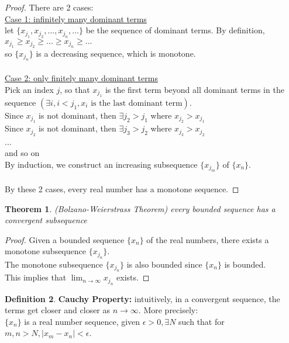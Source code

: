\documentclass[12pt]{article}
\theoremstyle{plain}
\newtheorem{theorem}{Theorem}[section]
\theoremstyle{definition}
\newtheorem{definition}[theorem]{Definition}
\begin{document}
\begin{proof}
    There are 2 cases:\\
    \underline{Case 1: infinitely many dominant terms}\\
    let $\{ x_{j_1}, x_{j_2}, ..., x_{j_n},... \}$ be the sequence of dominant terms. By definition, $x_{j_1} \geq x_{j_2} \geq ... \geq x_{j_n} \geq...$\\
    so $\{ x_{j_n} \}$ is a decreasing sequence, which is monotone.
    \\
    \\
    \underline{Case 2: only finitely many dominant terms}\\
    Pick an index $j$, so that $x_{j_1}$ is the first term beyond all dominant terms in the sequence $(\exists i, i<j_1, x_i \text{ is the last dominant term})$.\\
    Since $x_{j_1}$ is not dominant, then $\exists j_2 > j_1$ where $x_{j_2} > x_{j_1}$\\
    Since $x_{j_2}$ is not dominant, then $\exists j_3 > j_2$ where $x_{j_3} > x_{j_2}$\\
    ...\\
    and so on\\
    By induction, we construct an increasing subsequence $\{ x_{j_m} \}$ of $\{ x_n \}$.\\
    \\
    By these 2 cases, every real number has a monotone sequence.
    
\end{proof}

\begin{theorem}
    (Bolzano-Weierstrass Theorem) every bounded sequence has a convergent subsequence
\end{theorem}

\begin{proof}
    Given a bounded sequence $\{ x_n \}$ of the real numbers, there exists a monotone subsequence $\{ x_{j_n} \}$.\\
    The monotone subsequence $\{ x_{j_n} \}$ is also bounded since $\{ x_n \}$ is bounded.\\
    This implies that $\lim_{n\to\infty} x_{j_n} $ exists.
\end{proof}

\begin{definition}
    \textbf{Cauchy Property:} intuitively, in a convergent sequence, the terms get closer and closer as $n\to\infty$. More precisely:\\
    $\{ x_n \}$ is a real number sequence, given $\epsilon > 0, \exists N$ such that for $m,n > N, |x_m - x_n|<\epsilon$.
\end{definition}
\end{document}

